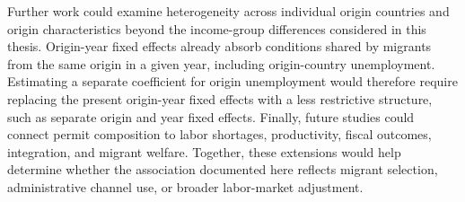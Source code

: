 \documentclass[11pt,a4paper]{article}
\begin{document}
Further work could examine heterogeneity across individual origin
countries and origin characteristics beyond the income-group differences
considered in this thesis. Origin-year fixed effects already absorb
conditions shared by migrants from the same origin in a given year,
including origin-country unemployment. Estimating a separate coefficient
for origin unemployment would therefore require replacing the present
origin-year fixed effects with a less restrictive structure, such as
separate origin and year fixed effects. Finally, future studies could
connect permit composition to labor shortages, productivity, fiscal
outcomes, integration, and migrant welfare. Together, these extensions
would help determine whether the association documented here reflects
migrant selection, administrative channel use, or broader labor-market
adjustment.

\clearpage
\end{document}
